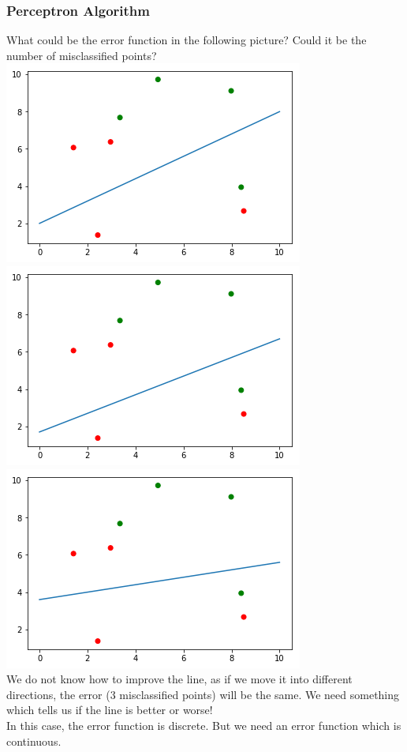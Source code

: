 \begin{frame}[fragile]
  \frametitle{Perceptron Algorithm}
  What could be the error function in the following picture? Could it be the number
  of misclassified points?\\
  \vspace{3mm}
  \includegraphics[scale=0.25]{img/error_1}
  \includegraphics[scale=0.25]{img/error_2}
  \includegraphics[scale=0.25]{img/error_3}\\
  \vspace{3mm}
  We do not know how to improve the line, as if we move it into different
  directions, the error (3 misclassified points) will be the same. We need
  something which tells us if the line is better or worse!\\
  In this case, the error function is discrete. But we need an error function
  which is continuous.
\end{frame}

